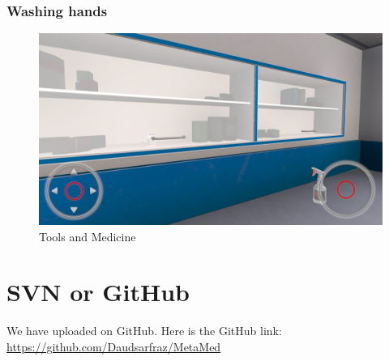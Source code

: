 \subsubsection{Washing hands}
\begin{figure}[h]
	\centering
	\includegraphics[width=0.65\linewidth]{Images/Tools and Medicine.png}
	\caption{Tools and Medicine}
	\label{fig:system-diagram}
\end{figure}

\section{SVN or GitHub}
We have uploaded on GitHub. Here is the GitHub link: \\
\href{https://github.com/Daudsarfraz/MetaMed}{https://github.com/Daudsarfraz/MetaMed}